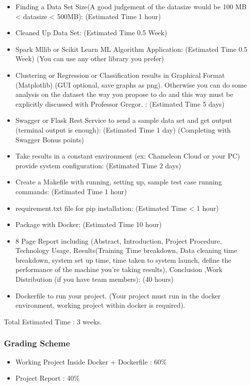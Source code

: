 \begin{itemize}
\item Finding a Data Set Size(A good judgement of the datasize would
  be 100 MB < datasize < 500MB): (Estimated Time 1 hour)
\item Cleaned Up Data Set: (Estimated Time 0.5 Week)
\item Spark Mllib or Scikit Learn ML Algorithm Application: (Estimated
  Time 0.5 Week) (You can use any other library you prefer)
\item Clustering or Regression or Classification results in Graphical
  Format (Matplotlib) (GUI optional, save graphs as png). Otherwise
  you can do some analysis on the dataset the way you propose to do
  and this way must be explicitly discussed with Professor Gregor. :
  (Estimated Time 5 days)
\item Swagger or Flask  Rest Service  to send  a sample data  set and  get output
  (terminal output is enough): (Estimated Time 1 day) (Completing with Swagger Bonus points)
\item Take results in a constant environment (ex: Chameleon Cloud or
  your PC) provide system configuration: (Estimated Time 2 days)
\item Create a Makefile with running, setting up, sample test case
  running commands: (Estimated Time 1 hour)
\item requirement.txt file for pip installation: (Estimated Time < 1 hour)
\item Package with Docker: (Estimated Time 10 hour)
\item 8 Page Report including (Abstract, Introduction, Project
  Procedure, Technology Usage, Results(Training Time breakdown, Data
  cleaning time breakdown, system set up time, time taken to system
  launch, define the performance of the machine you're taking
  results), Conclusion ,Work Distribution (if you have team members): (40 hours)
\item Dockerfile to run your project. (Your project must run in the
  docker environment, working project within docker is required).
\end{itemize}

Total Estimated Time : 3 weeks.

\subsubsection{Grading Scheme}

\begin{itemize}
\item Working Project Inside Docker + Dockerfile : 60\%
\item Project Report : 40\%
\end{itemize}

